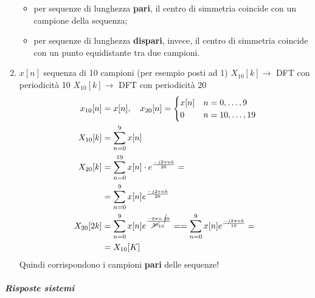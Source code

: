 \documentclass[
]{article}
\providecommand{\tightlist}{%
  \setlength{\itemsep}{0pt}\setlength{\parskip}{0pt}}
\begin{document}
\begin{enumerate}
  \begin{itemize}
  \tightlist
  \item
    per sequenze di lunghezza \textbf{pari}, il centro di simmetria
    coincide con un campione della sequenza;
  \item
    per sequenze di lunghezza \textbf{dispari}, invece, il centro di
    simmetria coincide con un punto equidistante tra due campioni.
  \end{itemize}
\item
  \(x[n]\) sequenza di 10 campioni (per esempio posti ad 1) \newline
  \(X_{10}[k] \rightarrow\) DFT con periodicità 10 \newline
  \(X_{10}[k] \rightarrow\) DFT con periodicità 20 \newline
  \begin{align*}
  x_{10}[n]&=x[n], \quad 
  x_{20}[n] = \begin{cases}x[n] & n=0,\dots,9 \\
  0 & n=10,\dots,19\end{cases} \\
  X_{10}[k]&=\sum_{n=0}^9 x[n]  \\
  X_{20}[k]&=\sum_{n=0}^{19} x[n] \cdot e^{\frac{-j2\pi nk}{20}}= \\
  & =\sum_{n=0}^9 x[n] e^{\frac{-j2\pi nk}{20}} \\
  X_{20}[2k]&=\sum_{n=0}^9 x[n] e^{\frac{-2 \pi n \cdot \cancel{2}k}{\cancel{20}_{10}}} =
   =\sum_{n=0}^{9} x[n] e^{\frac{-j2\pi nk}{10}}= \\
  & =X_{10}[K] \\
  \end{align*} Quindi corrispondono i campioni \textbf{pari} delle
  sequenze!
\end{enumerate}

\subparagraph{Risposte sistemi}\label{risposte-sistemi}
\end{document}
